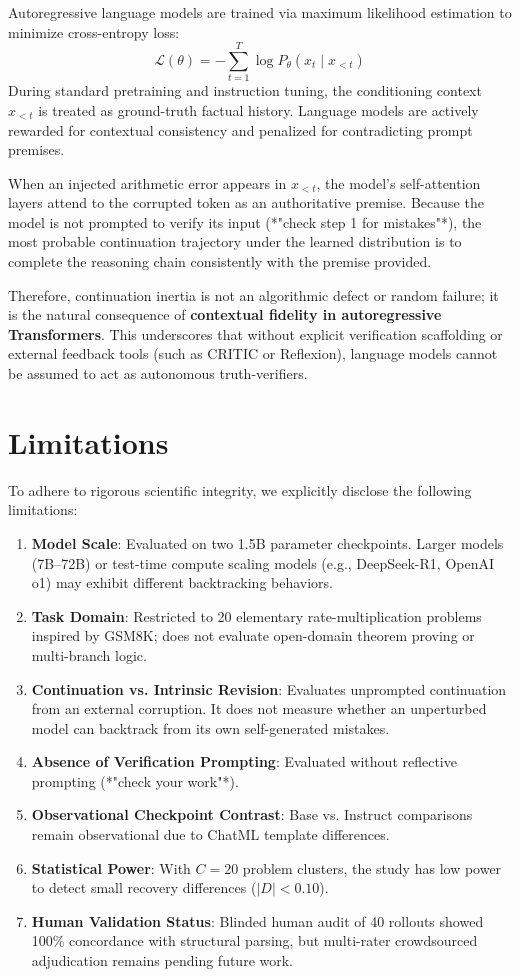\documentclass[11pt,letterpaper]{article}
\begin{document}
Autoregressive language models are trained via maximum likelihood estimation to minimize cross-entropy loss:
\begin{equation}
\mathcal{L}(\theta) = -\sum_{t=1}^{T} \log P_\theta(x_t \mid x_{<t})
\end{equation}
During standard pretraining and instruction tuning, the conditioning context $x_{<t}$ is treated as ground-truth factual history. Language models are actively rewarded for contextual consistency and penalized for contradicting prompt premises. 

When an injected arithmetic error appears in $x_{<t}$, the model's self-attention layers attend to the corrupted token as an authoritative premise. Because the model is not prompted to verify its input (*"check step 1 for mistakes"*), the most probable continuation trajectory under the learned distribution is to complete the reasoning chain consistently with the premise provided. 

Therefore, continuation inertia is not an algorithmic defect or random failure; it is the natural consequence of \textbf{contextual fidelity in autoregressive Transformers}. This underscores that without explicit verification scaffolding or external feedback tools (such as CRITIC or Reflexion), language models cannot be assumed to act as autonomous truth-verifiers.

\section{Limitations}

To adhere to rigorous scientific integrity, we explicitly disclose the following limitations:
\begin{enumerate}[leftmargin=*]
    \item \textbf{Model Scale}: Evaluated on two 1.5B parameter checkpoints. Larger models (7B--72B) or test-time compute scaling models (e.g., DeepSeek-R1, OpenAI o1) may exhibit different backtracking behaviors.
    \item \textbf{Task Domain}: Restricted to 20 elementary rate-multiplication problems inspired by GSM8K; does not evaluate open-domain theorem proving or multi-branch logic.
    \item \textbf{Continuation vs. Intrinsic Revision}: Evaluates unprompted continuation from an external corruption. It does not measure whether an unperturbed model can backtrack from its own self-generated mistakes.
    \item \textbf{Absence of Verification Prompting}: Evaluated without reflective prompting (*"check your work"*).
    \item \textbf{Observational Checkpoint Contrast}: Base vs. Instruct comparisons remain observational due to ChatML template differences.
    \item \textbf{Statistical Power}: With $C=20$ problem clusters, the study has low power to detect small recovery differences ($|D| < 0.10$).
    \item \textbf{Human Validation Status}: Blinded human audit of 40 rollouts showed 100\% concordance with structural parsing, but multi-rater crowdsourced adjudication remains pending future work.
\end{enumerate}
\end{document}
